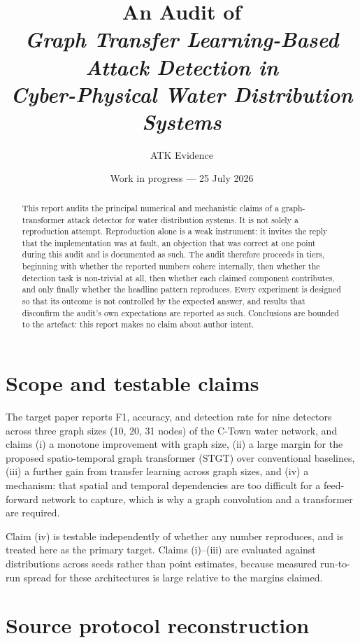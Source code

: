 \documentclass[11pt]{article}
\title{An Audit of\\
\emph{Graph Transfer Learning-Based Attack Detection in\\
Cyber-Physical Water Distribution Systems}}
\author{ATK Evidence}
\date{Work in progress --- 25 July 2026}
\begin{document}
\maketitle

\begin{abstract}
This report audits the principal numerical and mechanistic claims of a
graph-transformer attack detector for water distribution systems. It is not
solely a reproduction attempt. Reproduction alone is a weak instrument: it
invites the reply that the implementation was at fault, an objection that was
correct at one point during this audit and is documented as such. The audit
therefore proceeds in tiers, beginning with whether the reported numbers cohere
internally, then whether the detection task is non-trivial at all, then whether
each claimed component contributes, and only finally whether the headline
pattern reproduces. Every experiment is designed so that its outcome is not
controlled by the expected answer, and results that disconfirm the audit's own
expectations are reported as such. Conclusions are bounded to the artefact: this
report makes no claim about author intent.
\end{abstract}

\section{Scope and testable claims}

The target paper reports F1, accuracy, and detection rate for nine detectors
across three graph sizes (10, 20, 31 nodes) of the C-Town water network, and
claims (i) a monotone improvement with graph size, (ii) a large margin for the
proposed spatio-temporal graph transformer (STGT) over conventional baselines,
(iii) a further gain from transfer learning across graph sizes, and (iv) a
mechanism: that spatial and temporal dependencies are too difficult for a
feed-forward network to capture, which is why a graph convolution and a
transformer are required.

Claim (iv) is testable independently of whether any number reproduces, and is
treated here as the primary target. Claims (i)--(iii) are evaluated against
distributions across seeds rather than point estimates, because measured
run-to-run spread for these architectures is large relative to the margins
claimed.

\section{Source protocol reconstruction}
\end{document}
